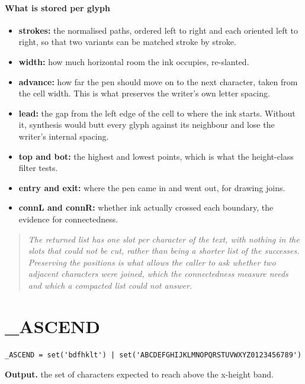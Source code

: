 \paragraph{What is stored per glyph}

\begin{itemize}\setlength\itemsep{0pt}
  \item \textbf{strokes:} the normalised paths, ordered left to right and each oriented left to right, so that two variants can be matched stroke by stroke.
  \item \textbf{width:} how much horizontal room the ink occupies, re-slanted.
  \item \textbf{advance:} how far the pen should move on to the next character, taken from the cell width. This is what preserves the writer's own letter spacing.
  \item \textbf{lead:} the gap from the left edge of the cell to where the ink starts. Without it, synthesis would butt every glyph against its neighbour and lose the writer's internal spacing.
  \item \textbf{top and bot:} the highest and lowest points, which is what the height-class filter tests.
  \item \textbf{entry and exit:} where the pen came in and went out, for drawing joins.
  \item \textbf{connL and connR:} whether ink actually crossed each boundary, the evidence for connectedness.
\end{itemize}

\begin{quote}\small\itshape The returned list has one slot per character of the text, with nothing in the slots that could not be cut, rather than being a shorter list of the successes. Preserving the positions is what allows the caller to ask whether two \emph{adjacent} characters were joined, which the connectedness measure needs and which a compacted list could not answer.\end{quote}

\section{\_ASCEND}
\begin{lstlisting}[style=sig]
_ASCEND = set('bdfhklt') | set('ABCDEFGHIJKLMNOPQRSTUVWXYZ0123456789')
\end{lstlisting}

\noindent\textbf{Output.} the set of characters expected to reach above the x-height band.


